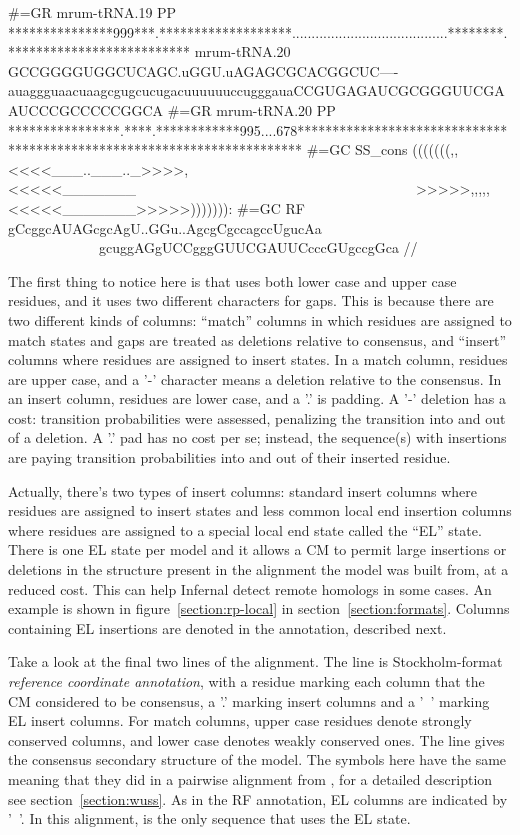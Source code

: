 \begin{sreoutput}
#=GR mrum-tRNA.19 PP ***************999***.*******************........................................********.**************************
mrum-tRNA.20         GCCGGGGUGGCUCAGC.uGGU.uAGAGCGCACGGCUC----auaggguaacuaagcgugcucugacuuuuuuccugggauaCCGUGAGAUCGCGGGUUCGAAUCCCGCCCCCGGCA
#=GR mrum-tRNA.20 PP ****************.****.************995....678************************************************************************
#=GC SS_cons         (((((((,,<<<<___..___.._>>>>,<<<<<_______~~~~~~~~~~~~~~~~~~~~~~~~~~~~~~~~~~~~~~~~>>>>>,,,,,<<<<<_______>>>>>))))))):
#=GC RF              gCcggcAUAGcgcAgU..GGu..AgcgCgccagccUgucAa~~~~~~~~~~~~~~~~~~~~~~~~~~~~~~~~~~~~~~~~gcuggAGgUCCgggGUUCGAUUCcccGUgccgGca
//
\end{sreoutput}

The first thing to notice here is that  uses both lower
case and upper case residues, and it uses two different characters for
gaps. This is because there are two different kinds of columns:
``match'' columns in which residues are assigned to match states and
gaps are treated as deletions relative to consensus, and ``insert''
columns where residues are assigned to insert states.
In a match column, residues are upper case, and a '-'
character means a deletion relative to the consensus. In an insert
column, residues are lower case, and a '.' is padding.  A '-' deletion
has a cost: transition probabilities were assessed, penalizing the
transition into and out of a deletion. A '.' pad has no cost per se;
instead, the sequence(s) with insertions are paying transition
probabilities into and out of their inserted residue.

Actually, there's two types of insert columns: standard insert columns
where residues are assigned to insert states and less common local end
insertion columns where residues are assigned to a special local end
state called the ``EL'' state. There is one EL state per model and it
allows a CM to permit large insertions or deletions in the structure
present in the alignment the model was built from, at a reduced
cost. This can help Infernal detect remote homologs in some cases. An
example is shown in figure~\ref{section:rp-local} in
section~\ref{section:formats}. Columns containing EL insertions are
denoted in the  annotation, described next.

Take a look at the final two lines of the alignment. The  line is Stockholm-format \emph{reference coordinate annotation},
with a residue marking each column that the CM considered to be
consensus, a '.' marking insert columns and a '~' marking EL insert
columns. For match columns, upper case residues denote strongly
conserved columns, and lower case denotes weakly conserved ones. The
 line gives the consensus secondary structure of
the model. The symbols here have the same meaning that they did in a
pairwise alignment from , for a detailed description
see section~\ref{section:wuss}. As in the RF annotation, EL columns
are indicated by '~'. In this alignment,  is the
only sequence that uses the EL state. 

